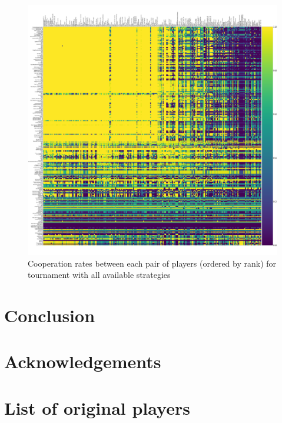 \documentclass{article}
\begin{document}
\begin{figure}[!hbtp]
    \centering
    \includegraphics[width=.8\textwidth]{assets/full_tournament_pairwise_cooperation_rates}
    \caption{Cooperation rates between each pair of players (ordered by rank)
    for tournament with all available strategies}
    \label{fig:full_tournament_pairwise_cooperation_rates}
\end{figure}

\section{Conclusion}\label{sec:conclusion}

\section*{Acknowledgements}





\appendix

\section{List of original players}\label{app:list_of_original_players}


\begin{multicols}{2}
    \begin{enumerate}
            
    \end{enumerate}
\end{multicols}
\end{document}
